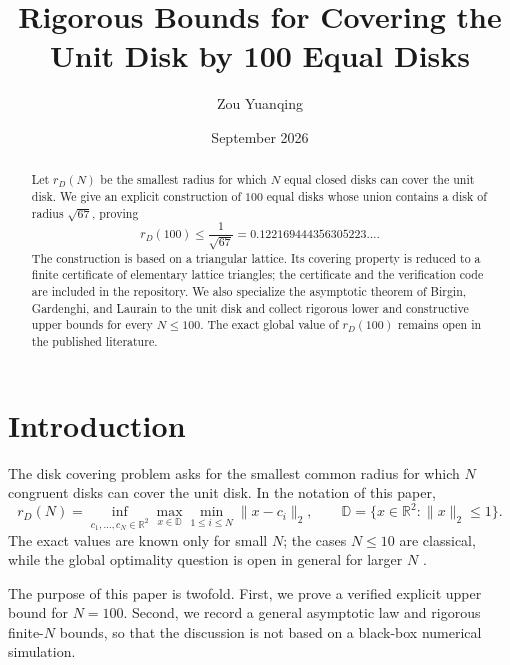 \documentclass[11pt]{article}
\title{Rigorous Bounds for Covering the Unit Disk by 100 Equal Disks}
\author{Zou Yuanqing}
\date{September 2026}
\theoremstyle{definition}
\newcommand{\R}{\mathbb{R}}
\newcommand{\D}{\mathbb{D}}
\begin{document}
\maketitle

\begin{abstract}
Let $r_D(N)$ be the smallest radius for which $N$ equal closed disks
can cover the unit disk.  We give an explicit construction of $100$
equal disks whose union contains a disk of radius $\sqrt{67}$, proving
\[
  r_D(100)\le \frac{1}{\sqrt{67}}
  =0.122169444356305223\ldots .
\]
The construction is based on a triangular lattice.  Its covering
property is reduced to a finite certificate of elementary lattice
triangles; the certificate and the verification code are included in
the repository.  We also specialize the asymptotic theorem of Birgin,
Gardenghi, and Laurain to the unit disk and collect rigorous lower and
constructive upper bounds for every $N\le 100$.  The exact global value
of $r_D(100)$ remains open in the published literature.
\end{abstract}

\tableofcontents

\section{Introduction}

The disk covering problem asks for the smallest common radius for which
$N$ congruent disks can cover the unit disk.  In the notation of this
paper,
\begin{equation}
  r_D(N)
  =
  \inf_{c_1,\dots,c_N\in\R^2}
  \max_{x\in \D}
  \min_{1\le i\le N}\|x-c_i\|_2 ,
  \qquad
  \D=\{x\in\R^2:\|x\|_2\le 1\}.
  \label{eq:definition}
\end{equation}
The exact values are known only for small $N$; the cases $N\le10$ are
classical, while the global optimality question is open in general for
larger $N$ \cite{Kershner1939,FejesToth2005,FriedmanCovering}.

The purpose of this paper is twofold.  First, we prove a verified
explicit upper bound for $N=100$.  Second, we record a general
asymptotic law and rigorous finite-$N$ bounds, so that the discussion
is not based on a black-box numerical simulation.
\end{document}
